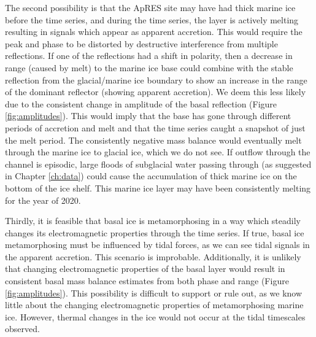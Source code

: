 The second possibility is that the ApRES site may have had thick marine ice  before the time series, and during the time series, the layer is actively melting resulting in signals which appear as apparent accretion. This would require the peak and phase to be distorted by destructive interference from multiple reflections. If one of the reflections had a shift in polarity, then a decrease in range (caused by melt) to the marine ice base could combine with the stable reflection from the glacial/marine ice boundary to show an increase in the range of the dominant reflector (showing apparent accretion). We deem this less likely due to the consistent change in amplitude of the basal reflection (Figure \ref{fig:amplitudes}).
This would imply that the base has gone through different periods of accretion and melt and that the time series caught a snapshot of just the melt period. The consistently negative mass balance would eventually melt through the marine ice to glacial ice, which we do not see.  If outflow through the channel is episodic, large floods of subglacial water passing through (as suggested in Chapter \ref{ch:data}) could cause the accumulation of thick marine ice on the bottom of the  ice shelf. This marine ice layer may have been consistently melting for the year of 2020. 

Thirdly, it is feasible that basal ice is metamorphosing in a way which steadily changes its electromagnetic properties through the time series. If true, basal ice metamorphosing must be influenced by tidal forces, as we can see tidal signals in the apparent accretion. This scenario is improbable. Additionally, it is unlikely that changing electromagnetic properties of the basal layer would result in consistent basal mass balance estimates from both phase and range (Figure \ref{fig:amplitudes}).  This possibility is difficult to support or rule out, as we know little about the changing electromagnetic properties of metamorphosing marine ice. However, thermal changes in the ice would not occur at the tidal timescales observed. 



